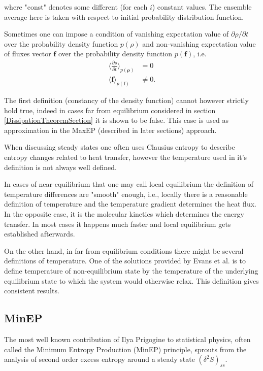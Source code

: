 \documentclass[a4paper,12pt]{article}
\begin{document}
where "const" denotes some different (for each $i$) constant values. The ensemble average here is taken with respect to initial probability distribution function.

Sometimes one can impose a condition of vanishing expectation value of $\partial \rho / \partial t$ over the probability density function $p(\rho)$ and non-vanishing expectation value of fluxes vector $\bm{f}$ over the probability density function $p(\bm{f})$\cite{Dewar:2014ek}, i.e.
\begin{equation}
\begin{aligned}
\label{SteadyStates}
  \langle \frac{\partial \rho}{\partial t} \rangle_{p(\bm{\rho})} &= 0 \\
  \langle \bm{f} \rangle_{p(\bm{f})} &\neq 0.
\end{aligned}
\end{equation}

The first definition (constancy of the density function) cannot however strictly hold true, indeed in cases far from equilibrium considered in section \ref{DissipationTheoremSection} it is shown to be false. This case is used as approximation in the MaxEP (described in later sections) approach.

When discussing steady states one often uses Clausius entropy to describe entropy changes related to heat transfer, however the temperature used in it's definition is not always well defined. 

In cases of near-equilibrium that one may call local equilibrium the definition of temperature differences are "smooth" enough, i.e., locally there is a reasonable definition of temperature and the temperature gradient determines the heat flux. 
In the opposite case, it is the molecular kinetics which determines the energy transfer. In most cases it happens much faster and local equilibrium gets established afterwards.

On the other hand, in far from equilibrium conditions there might be several definitions of temperature. One of the solutions provided by Evans et al.\cite{Evans:2241458} is to define temperature of non-equilibrium state by the temperature of the underlying equilibrium state to which the system would otherwise relax. This definition gives consistent results.

\subsection{MinEP}

The most well known contribution of Ilya Prigogine to statistical physics, often called the Minimum Entropy Production (MinEP) principle, sprouts from the analysis of second order excess entropy around a steady state $ (\delta^2 S)_{ss} $. 
\end{document}
